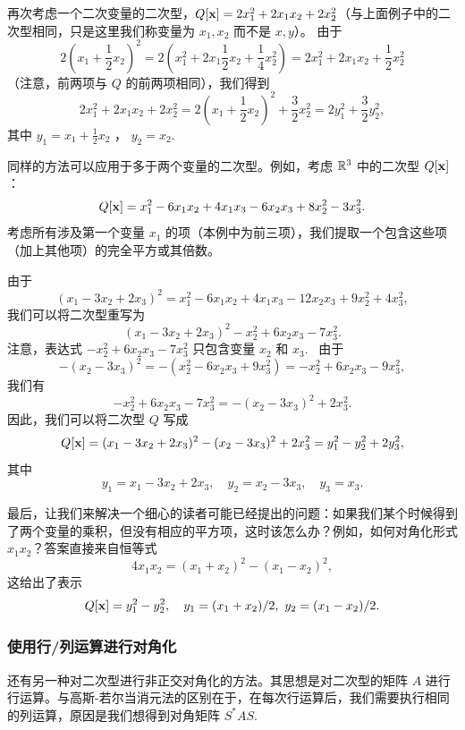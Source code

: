 再次考虑一个二次变量的二次型，$Q[\mathbf{x}] = 2x_1^2 + 2x_1x_2 + 2x_2^2$（与上面例子中的二次型相同，只是这里我们称变量为 $x_1, x_2$ 而不是 $x, y$）。
由于
$$2(x_1 + \frac{1}{2}x_2)^2 = 2(x_1^2 + 2x_1 \frac{1}{2}x_2 + \frac{1}{4}x_2^2) = 2x_1^2 + 2x_1x_2 + \frac{1}{2}x_2^2$$（注意，前两项与 $Q$ 的前两项相同），我们得到
$$2x_1^2 + 2x_1x_2 + 2x_2^2 = 2(x_1 + \frac{1}{2}x_2)^2 + \frac{3}{2}x_2^2 = 2y_1^2 + \frac{3}{2}y_2^2,$$
其中 $y_1 = x_1 + \frac{1}{2}x_2$ ， $y_2 = x_2$.~

同样的方法可以应用于多于两个变量的二次型。例如，考虑 $\mathbb{R}^3$ 中的二次型 $Q[\mathbf{x}]$：
$$Q[\mathbf{x}] = x_1^2 - 6x_1x_2 + 4x_1x_3 - 6x_2x_3 + 8x_2^2 - 3x_3^2.$$
考虑所有涉及第一个变量 $x_1$ 的项（本例中为前三项），我们提取一个包含这些项（加上其他项）的完全平方或其倍数。

由于 $$(x_1 - 3x_2 + 2x_3)^2 = x_1^2 - 6x_1x_2 + 4x_1x_3 - 12x_2x_3 + 9x_2^2 + 4x_3^2,$$
我们可以将二次型重写为
$$(x_1 - 3x_2 + 2x_3)^2 - x_2^2 + 6x_2x_3 - 7x_3^2.$$
注意，表达式 $-x_2^2 + 6x_2x_3 - 7x_3^2$ 只包含变量 $x_2$ 和 $x_3$.~
由于
$$-(x_2 - 3x_3)^2 = -(x_2^2 - 6x_2x_3 + 9x_3^2) = -x_2^2 + 6x_2x_3 - 9x_3^2,$$
我们有
$$-x_2^2 + 6x_2x_3 - 7x_3^2 = -(x_2 - 3x_3)^2 + 2x_3^2.$$
因此，我们可以将二次型 $Q$ 写成
$$Q[\mathbf{x}] = (x_1 - 3x_2 + 2x_3)^2 - (x_2 - 3x_3)^2 + 2x_3^2 = y_1^2 - y_2^2 + 2y_3^2,$$
其中 $$y_1 = x_1 - 3x_2 + 2x_3,\quad y_2 = x_2 - 3x_3,\quad y_3 = x_3.$$

最后，让我们来解决一个细心的读者可能已经提出的问题：如果我们某个时候得到了两个变量的乘积，但没有相应的平方项，这时该怎么办？例如，如何对角化形式 $x_1x_2$？答案直接来自恒等式
\begin{equation}\label{eq:07-02-01}
4x_1x_2 = (x_1 + x_2)^2 - (x_1 - x_2)^2,
\end{equation}
这给出了表示
$$Q[\mathbf{x}] = y_1^2 - y_2^2,\quad y_1 = (x_1 + x_2)/2,~y_2 = (x_1 - x_2)/2.$$

\subsubsection{使用行/列运算进行对角化}\label{sec:07-02-02-02}

还有另一种对二次型进行非正交对角化的方法。其思想是对二次型的矩阵 $A$ 进行行运算。与高斯-若尔当消元法的区别在于，在每次行运算后，我们需要执行相同的列运算，原因是我们想得到对角矩阵 $S^*AS$.~

